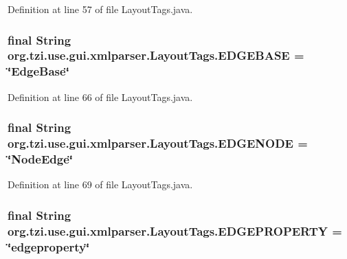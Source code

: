 Definition at line 57 of file Layout\-Tags.\-java.

\hypertarget{classorg_1_1tzi_1_1use_1_1gui_1_1xmlparser_1_1_layout_tags_a3a29d75f4881193ac7b30cfee0bfb6e7}{
\subsubsection[{E\-D\-G\-E\-B\-A\-S\-E}]{\setlength{\rightskip}{0pt plus 5cm}final String org.\-tzi.\-use.\-gui.\-xmlparser.\-Layout\-Tags.\-E\-D\-G\-E\-B\-A\-S\-E = \char`\"{}Edge\-Base\char`\"{}\hspace{0.3cm}{\ttfamily [static]}}}\label{classorg_1_1tzi_1_1use_1_1gui_1_1xmlparser_1_1_layout_tags_a3a29d75f4881193ac7b30cfee0bfb6e7}


Definition at line 66 of file Layout\-Tags.\-java.

\hypertarget{classorg_1_1tzi_1_1use_1_1gui_1_1xmlparser_1_1_layout_tags_a9e00e4d99bb32893c84081e1f51642b4}{
\subsubsection[{E\-D\-G\-E\-N\-O\-D\-E}]{\setlength{\rightskip}{0pt plus 5cm}final String org.\-tzi.\-use.\-gui.\-xmlparser.\-Layout\-Tags.\-E\-D\-G\-E\-N\-O\-D\-E = \char`\"{}Node\-Edge\char`\"{}\hspace{0.3cm}{\ttfamily [static]}}}\label{classorg_1_1tzi_1_1use_1_1gui_1_1xmlparser_1_1_layout_tags_a9e00e4d99bb32893c84081e1f51642b4}


Definition at line 69 of file Layout\-Tags.\-java.

\hypertarget{classorg_1_1tzi_1_1use_1_1gui_1_1xmlparser_1_1_layout_tags_a81abbe07631287c9416e3cd21ebf5458}{
\subsubsection[{E\-D\-G\-E\-P\-R\-O\-P\-E\-R\-T\-Y}]{\setlength{\rightskip}{0pt plus 5cm}final String org.\-tzi.\-use.\-gui.\-xmlparser.\-Layout\-Tags.\-E\-D\-G\-E\-P\-R\-O\-P\-E\-R\-T\-Y = \char`\"{}edgeproperty\char`\"{}\hspace{0.3cm}{\ttfamily [static]}}}\label{classorg_1_1tzi_1_1use_1_1gui_1_1xmlparser_1_1_layout_tags_a81abbe07631287c9416e3cd21ebf5458}


